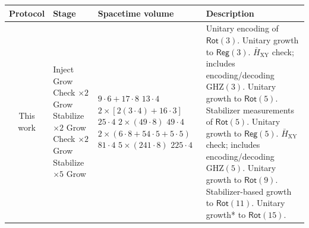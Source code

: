 \documentclass[%
    aps, 
    physrev,
    reprint,
]{revtex4-2}
\newcommand{\rot}[1]{\mathsf{Rot}(#1)}
\newcommand{\reg}[1]{\mathsf{Reg}(#1)}
\newcommand{\GHZ}[1]{\text{GHZ}(#1)}
\newcommand{\XY}{_\mathrm{XY}}
\begin{document}
\begin{table}
\centering
    \begin{tabular}{|c|l|l|l|}
    \hline
    \textbf{Protocol} & \textbf{Stage} & \textbf{Spacetime volume} & \textbf{Description} \\ \hline
    \makecell[c]{This \\ work} &
    \makecell[l]{Inject \\ 
                Grow \\
                Check $\times2$ \\
                Grow \\
                Stabilize $\times2$ \\
                Grow \\
                Check $\times2$ \\
                Grow \\
                Stabilize $\times5$ \\
                Grow
                } &
    \makecell[l]{$9\cdot 6 + 17\cdot 8$ \\
                $13\cdot 4$ \\
                $2\times [2(3\cdot 4)+16\cdot 3]$ \\
                $25\cdot 4$\\
                $2\times (49 \cdot 8)$ \\
                $49 \cdot 4$ \\
                $2\times (6\cdot 8 + 54\cdot 5 + 5\cdot 5)$ \\
                $81\cdot4$ \\
                $5\times (241\cdot8)$ \\
                $225\cdot4$
                } &
    \makecell[l]{Unitary encoding of $\rot3$. \\
                Unitary growth to $\reg3$. \\
                $\bar{H}\XY$ check; includes encoding/decoding $\GHZ{3}$. \\ 
                Unitary growth to $\rot5$. \\ 
                Stabilizer measurements of $\rot5$. \\ 
                Unitary growth to $\reg5$. \\ 
                $\bar{H}\XY$ check; includes encoding/decoding $\GHZ{5}$. \\
                Unitary growth to $\rot9$. \\
                Stabilizer-based growth to $\rot{11}$. \\
                Unitary growth* to $\rot{15}$.
                } \\ \hline
                

\end{tabular}
\end{table}
\end{document}
